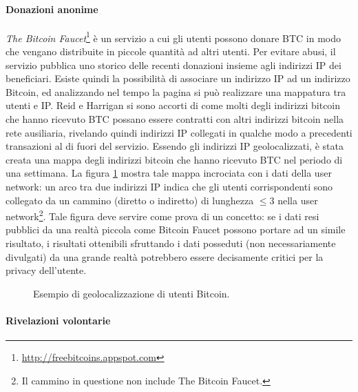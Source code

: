 \paragraph{Donazioni anonime}

\emph{The Bitcoin Faucet}\footnote{\url{http://freebitcoins.appspot.com}} è un servizio a cui gli utenti possono donare BTC in modo che vengano distribuite in piccole quantità ad altri utenti. Per evitare abusi, il servizio pubblica uno storico delle recenti donazioni insieme agli indirizzi IP dei beneficiari. Esiste quindi la possibilità di associare un indirizzo IP ad un indirizzo Bitcoin, ed analizzando nel tempo la pagina si può realizzare una mappatura tra utenti e IP.
Reid e Harrigan si sono accorti di come molti degli indirizzi bitcoin che hanno ricevuto BTC possano essere contratti con altri indirizzi bitcoin nella rete ausiliaria, rivelando quindi indirizzi IP collegati in qualche modo a precedenti transazioni al di fuori del servizio.
Essendo gli indirizzi IP geolocalizzati, è stata creata una mappa degli indirizzi bitcoin che hanno ricevuto BTC nel periodo di una settimana. La figura \ref{anonimato_pag_16} mostra tale mappa incrociata con i dati della user network: un arco tra due indirizzi IP indica che gli utenti corrispondenti sono collegato da un cammino (diretto o indiretto) di lunghezza $\leq 3$ nella user network\footnote{Il cammino in questione non include The Bitcoin Faucet.}. Tale figura deve servire come prova di un concetto: se i dati resi pubblici da una realtà piccola come Bitcoin Faucet possono portare ad un simile risultato, i risultati ottenibili sfruttando i dati posseduti (non necessariamente divulgati) da una grande realtà potrebbero essere decisamente critici per la privacy dell'utente.


\begin{figure}[htbp]
  \centering
  \hfill
  \caption[Geolocalizzazione]{Esempio di geolocalizzazione di utenti Bitcoin.\label{anonimato_pag_16}}
\end{figure}

\paragraph{Rivelazioni volontarie}

